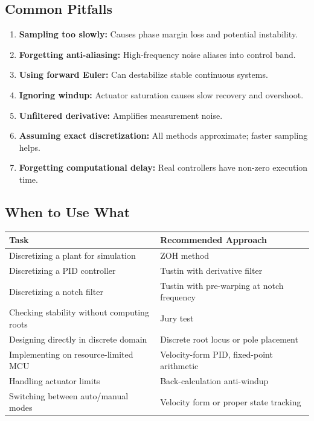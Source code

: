 \subsection{Common Pitfalls}

\begin{enumerate}
    \item \textbf{Sampling too slowly:} Causes phase margin loss and potential instability.

    \item \textbf{Forgetting anti-aliasing:} High-frequency noise aliases into control band.

    \item \textbf{Using forward Euler:} Can destabilize stable continuous systems.

    \item \textbf{Ignoring windup:} Actuator saturation causes slow recovery and overshoot.

    \item \textbf{Unfiltered derivative:} Amplifies measurement noise.

    \item \textbf{Assuming exact discretization:} All methods approximate; faster sampling helps.

    \item \textbf{Forgetting computational delay:} Real controllers have non-zero execution time.
\end{enumerate}

\subsection{When to Use What}

\begin{center}
\begin{tabular}{p{5cm}p{8cm}}
\toprule
\textbf{Task} & \textbf{Recommended Approach} \\
\midrule
Discretizing a plant for simulation & ZOH method \\
Discretizing a PID controller & Tustin with derivative filter \\
Discretizing a notch filter & Tustin with pre-warping at notch frequency \\
Checking stability without computing roots & Jury test \\
Designing directly in discrete domain & Discrete root locus or pole placement \\
Implementing on resource-limited MCU & Velocity-form PID, fixed-point arithmetic \\
Handling actuator limits & Back-calculation anti-windup \\
Switching between auto/manual modes & Velocity form or proper state tracking \\
\bottomrule
\end{tabular}
\end{center}

